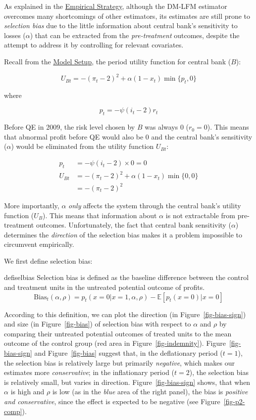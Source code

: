 \documentclass[
  a4paper,
  abstract=true]{scrartcl}
\theoremstyle{definition}
\begin{document}
As explained in the \hyperref[sec-empirical]{Empirical Strategy},
although the DM-LFM estimator overcomes many shortcomings of other
estimators, its estimates are still prone to \emph{selection bias} due
to the little information about central bank's sensitivity to losses
(\(\alpha\)) that can be extracted from the \emph{pre-treatment}
outcomes, despite the attempt to address it by controlling for relevant
covariates.

Recall from the \hyperref[model-setup]{Model Setup}, the period utility
function for central bank (\(B\)):

\[
U_{Bt} = -(\pi_t-2)^2 + \alpha(1-x_t)\min\{p_t,0\}
\]

where

\[
p_t=-\psi(i_t-2)r_t
\]

Before QE in 2009, the risk level chosen by \(B\) was always 0
(\(r_0=0\)). This means that abnormal profit before QE would also be 0
and the central bank's sensitivity (\(\alpha\)) would be eliminated from
the utility function \(U_{Bt}\):

\begin{align*}
p_t&=-\psi(i_t-2)\times0=0\\
U_{Bt}&= -(\pi_t-2)^2 + \alpha(1-x_t)\min\{0,0\} \\
&=-(\pi_t-2)^2
\end{align*}

More importantly, \(\alpha\) \emph{only} affects the system through the
central bank's utility function (\(U_B\)). This means that information
about \(\alpha\) is not extractable from pre-treatment outcomes.
Unfortunately, the fact that central bank sensitivity (\(\alpha\))
determines the \emph{direction} of the selection bias makes it a problem
impossible to circumvent empirically.

We first define selection bias:

\begin{restatable}{defi}{selbias}
\label{defi-selbias}
Selection bias is defined as the baseline difference between the control and treatment units in the untreated potential outcome of profits.
$$
\text{Bias}_t(\alpha,\rho)=p_t(x=0|x=1,\alpha,\rho)-\mathbb{E}[p_t(x=0)|x=0]
$$
\end{restatable}

According to this definition, we can plot the direction (in
Figure~\ref{fig-bias-sign}) and size (in Figure~\ref{fig-bias}) of
selection bias with respect to \(\alpha\) and \(\rho\) by comparing
their untreated potential outcomes of treated units to the mean outcome
of the control group (red area in Figure~\ref{fig-indemnity}).
Figure~\ref{fig-bias-sign} and Figure~\ref{fig-bias} suggest that, in
the deflationary period (\(t=1\)), the selection bias is relatively
large but primarily \emph{negative}, which makes our estimates more
\emph{conservative}; in the inflationary period (\(t=2\)), the selection
bias is relatively small, but varies in direction.
Figure~\ref{fig-bias-sign} shows, that when \(\alpha\) is high and
\(\rho\) is low (as in the \emph{blue} area of the right panel), the
bias is \emph{positive and conservative}, since the effect is expected
to be negative (see Figure~\ref{fig-p2-comp}).
\end{document}
